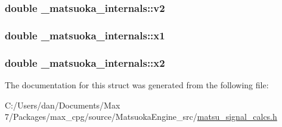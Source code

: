 \subsubsection[{\texorpdfstring{v2}{v2}}]{\setlength{\rightskip}{0pt plus 5cm}double \+\_\+matsuoka\+\_\+internals\+::v2}\hypertarget{struct__matsuoka__internals_afb33a7237b71962822b08c2e53f724a1}{}\label{struct__matsuoka__internals_afb33a7237b71962822b08c2e53f724a1}
\subsubsection[{\texorpdfstring{x1}{x1}}]{\setlength{\rightskip}{0pt plus 5cm}double \+\_\+matsuoka\+\_\+internals\+::x1}\hypertarget{struct__matsuoka__internals_a6f5497b0eabe8a0a644ef37b7db89baf}{}\label{struct__matsuoka__internals_a6f5497b0eabe8a0a644ef37b7db89baf}
\subsubsection[{\texorpdfstring{x2}{x2}}]{\setlength{\rightskip}{0pt plus 5cm}double \+\_\+matsuoka\+\_\+internals\+::x2}\hypertarget{struct__matsuoka__internals_ab23ab0f50b3bb8250da083b0fd49cb05}{}\label{struct__matsuoka__internals_ab23ab0f50b3bb8250da083b0fd49cb05}


The documentation for this struct was generated from the following file\+:\begin{DoxyCompactItemize}
\item 
C\+:/\+Users/dan/\+Documents/\+Max 7/\+Packages/max\+\_\+cpg/source/\+Matsuoka\+Engine\+\_\+src/\hyperlink{matsu__signal__calcs_8h}{matsu\+\_\+signal\+\_\+calcs.\+h}\end{DoxyCompactItemize}
